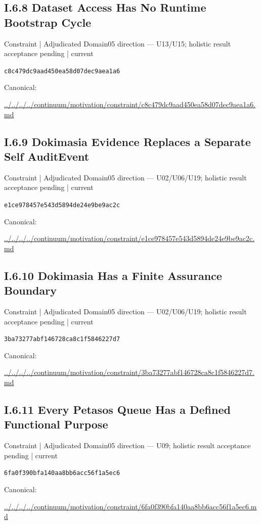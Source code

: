 \documentclass[10pt,a4paper]{article}
\begin{document}
\subsection*{I.6.8 Dataset Access Has No Runtime Bootstrap Cycle}
{\small Constraint | Adjudicated Domain05 direction — U13/U15; holistic result acceptance pending | current}\par
\texttt{c8c479dc9aad450ea58d07dec9aea1a6}\par
Canonical: \par
{\footnotesize\url{../../../../continuum/motivation/constraint/c8c479dc9aad450ea58d07dec9aea1a6.md}}\par
\subsection*{I.6.9 Dokimasia Evidence Replaces a Separate Self AuditEvent}
{\small Constraint | Adjudicated Domain05 direction — U02/U06/U19; holistic result acceptance pending | current}\par
\texttt{e1ce978457e543d5894de24e9be9ac2c}\par
Canonical: \par
{\footnotesize\url{../../../../continuum/motivation/constraint/e1ce978457e543d5894de24e9be9ac2c.md}}\par
\subsection*{I.6.10 Dokimasia Has a Finite Assurance Boundary}
{\small Constraint | Adjudicated Domain05 direction — U02/U06/U19; holistic result acceptance pending | current}\par
\texttt{3ba73277abf146728ca8c1f5846227d7}\par
Canonical: \par
{\footnotesize\url{../../../../continuum/motivation/constraint/3ba73277abf146728ca8c1f5846227d7.md}}\par
\subsection*{I.6.11 Every Petasos Queue Has a Defined Functional Purpose}
{\small Constraint | Adjudicated Domain05 direction — U09; holistic result acceptance pending | current}\par
\texttt{6fa0f390bfa140aa8bb6acc56f1a5ec6}\par
Canonical: \par
{\footnotesize\url{../../../../continuum/motivation/constraint/6fa0f390bfa140aa8bb6acc56f1a5ec6.md}}\par
\end{document}
